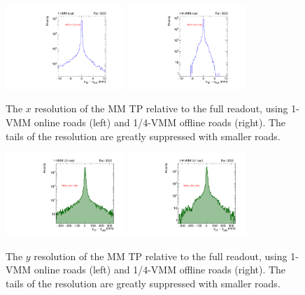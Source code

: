 \begin{figure}[!htpb]
  \begin{center}
    \includegraphics[width=0.4\textwidth]{figures/gbtanalysis3522/TP_xres_full.pdf}
    \includegraphics[width=0.4\textwidth]{figures/gbtanalysis3522/TP_xres.pdf}
  \end{center}
  \vspace{-10pt}
  \caption{The $x$ resolution of the MM TP relative to the full readout, using 1-VMM online roads (left) and 1/4-VMM offline roads (right). The tails of the resolution are greatly suppressed with smaller roads.}
  \label{fig:xres}
\end{figure}

\begin{figure}[!htpb]
  \begin{center}
    \includegraphics[width=0.4\textwidth]{figures/gbtanalysis3522/TP_yres_1road.pdf}
    \includegraphics[width=0.4\textwidth]{figures/gbtanalysis3522/TP_yres_smallroad.pdf}
  \end{center}
  \vspace{-10pt}
  \caption{The $y$ resolution of the MM TP relative to the full readout, using 1-VMM online roads (left) and 1/4-VMM offline roads (right). The tails of the resolution are greatly suppressed with smaller roads.}
  \label{fig:yres}
\end{figure}


